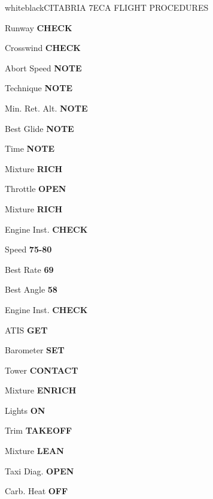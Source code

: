 \documentclass{article}
\begin{document}
\pagebreak

\begin{groupheading}{white}{black}{CITABRIA 7ECA FLIGHT PROCEDURES}
\end{groupheading}
\begin{multicols*}{3}

\colorbox{green!80!red}{}

Runway \dotfill \textbf{CHECK}

Crosswind \dotfill \textbf{CHECK}

Abort Speed \dotfill \textbf{NOTE}

Technique \dotfill \textbf{NOTE}

Min. Ret. Alt. \dotfill \textbf{NOTE}

Best Glide \dotfill \textbf{NOTE}

Time \dotfill \textbf{NOTE}

Mixture \dotfill \textbf{RICH}

\colorbox{green!80!red}{}

Throttle \dotfill \textbf{OPEN}

\colorbox{orange!80}{}

Mixture \dotfill \textbf{RICH}

Engine Inst. \dotfill \textbf{CHECK}

Speed \dotfill \textbf{75-80}

Best Rate \dotfill \textbf{69}

Best Angle \dotfill \textbf{58}

\colorbox{green!80!red}{}

Engine Inst. \dotfill \textbf{CHECK}

ATIS \dotfill \textbf{GET}

Barometer \dotfill \textbf{SET}

Tower \dotfill \textbf{CONTACT}

Mixture \dotfill \textbf{ENRICH}

Lights \dotfill \textbf{ON}

\colorbox{green!80!red}{}

Trim \dotfill \textbf{TAKEOFF}

Mixture \dotfill \textbf{LEAN}

Taxi Diag. \dotfill \textbf{OPEN}

Carb. Heat \dotfill \textbf{OFF} \\


\end{multicols*}
\end{document}
